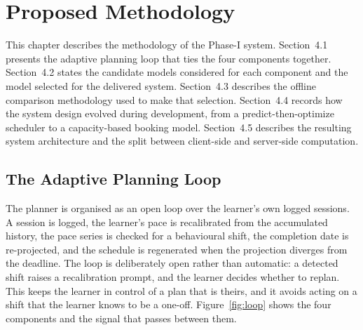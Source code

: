 \chapter{Proposed Methodology}
This chapter describes the methodology of the Phase-I system. Section~4.1 presents the adaptive planning loop that ties the four components together. Section~4.2 states the candidate models considered for each component and the model selected for the delivered system. Section~4.3 describes the offline comparison methodology used to make that selection. Section~4.4 records how the system design evolved during development, from a predict-then-optimize scheduler to a capacity-based booking model. Section~4.5 describes the resulting system architecture and the split between client-side and server-side computation.

\section{The Adaptive Planning Loop}
The planner is organised as an open loop over the learner's own logged sessions. A session is logged, the learner's pace is recalibrated from the accumulated history, the pace series is checked for a behavioural shift, the completion date is re-projected, and the schedule is regenerated when the projection diverges from the deadline. The loop is deliberately open rather than automatic: a detected shift raises a recalibration prompt, and the learner decides whether to replan. This keeps the learner in control of a plan that is theirs, and it avoids acting on a shift that the learner knows to be a one-off. Figure~\ref{fig:loop} shows the four components and the signal that passes between them.

